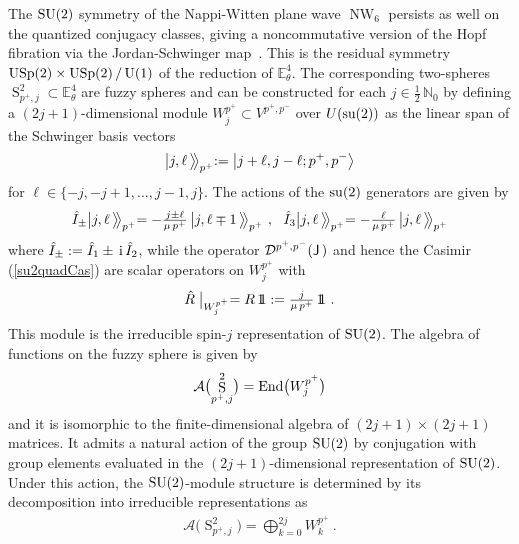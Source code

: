\documentclass[11pt,a4paper]{article}
\DeclareMathOperator{\Sphere}{S}
\DeclareMathOperator{\NW}{NW}
\let\S\Sphere
\newcommand{\ii}{{\rm i}}
\def\ii{{\,{\rm i}\,}}
\def\J{{\sf J}}
\def\mcDp{{\mathcal D}^{p^+,p^-}}
\newcommand{\nat}{{\mathbb N}} %
\newcommand{\eucl}{{\mathbb E}}
\newcommand{\id}{{1\!\!1}} %
\newcommand{\beq}{\begin{eqnarray}}
\newcommand{\eeq}{\end{eqnarray}}
\begin{document}
The ${\rm SU}(2)$ symmetry of the Nappi-Witten plane wave $\NW_6$
persists as well on the quantized conjugacy classes, giving a
noncommutative version of the Hopf fibration via the Jordan-Schwinger
map~\cite{G-BLMV1,HLS-J1}. This is the residual symmetry ${\rm
  USp}(2)\times{\rm USp}(2)\,/\,{\rm U}(1)$ of the reduction of
$\eucl_\theta^4$. The corresponding
two-spheres $\S_{p^+,j}^2\subset\eucl_\theta^4$ are fuzzy spheres and
can be constructed for each $j\in\frac12\,\nat_0$ by defining a
$(2j+1)$-dimensional module $W^{p^+}_j\subset V^{p^+,p^-}$ over
$U({\rm su}(2))$ as the linear span of the Schwinger basis vectors
\beq
\bigl|j,\ell\,\bigr\rangle\!\!\!
\bigm\rangle_{p^+}:=\bigl|j+\ell,j-\ell;p^+,p^-\bigr\rangle
\label{fuzzybasisdef}\eeq
for $\ell\in\{-j,-j+1,\dots,j-1,j\}$. The actions of the ${\rm su}(2)$
generators are given by
\beq
\hat I_\pm\bigl|j,\ell\,\bigr\rangle\!\!\!
\bigm\rangle_{p^+}=-\mbox{$\frac{j\pm\ell}
{\mu\,p^+}$}\,\bigl|j,\ell\mp1\,\bigr\rangle\!\!\!\bigm\rangle_{p^+} \ , ~~
\hat I_3\bigl|j,\ell\,\bigr\rangle\!\!\!\bigm\rangle_{p^+}
=-\mbox{$\frac\ell{\mu\,p^+}$}\,
\bigl|j,\ell\,\bigr\rangle\!\!\!\bigm\rangle_{p^+}
\label{su2irrepaction}\eeq
where $\hat I_\pm:=\hat I_1\pm\ii\hat I_2$, while the operator
$\mcDp(\J\,)$ and hence the Casimir (\ref{su2quadCas}) are scalar
operators on $W_j^{p^+}$ with
\beq
\hat R\bigm|_{W_j^{p^+}}=R\,\id:=\mbox{$\frac j{\mu\,p^+}$}\,\id \ .
\label{quadCasscalar}\eeq
This module is the irreducible spin-$j$ representation of ${\rm
  SU}(2)$. The algebra of functions on the fuzzy sphere is given by
\beq
\mathcal{A}\bigl(\S^2_{p^+,j}\bigr)={\rm End}\bigl(W^{p^+}_j\bigr)
\label{fuzzyfns}\eeq
and it is isomorphic to the finite-dimensional algebra of
$(2j+1)\times(2j+1)$ matrices. It admits a natural action of the group
${\rm SU}(2)$ by conjugation with group elements evaluated in the
$(2j+1)$-dimensional representation of ${\rm SU}(2)$. Under this
action, the ${\rm SU}(2)$-module structure is determined by its
decomposition into irreducible representations as
\beq
\mathcal{A}\bigl(\S^2_{p^+,j}\bigr)=\bigoplus_{k=0}^{2j}W_k^{p^+} \ .
\label{fuzzyfnsmodule}\eeq
\end{document}
